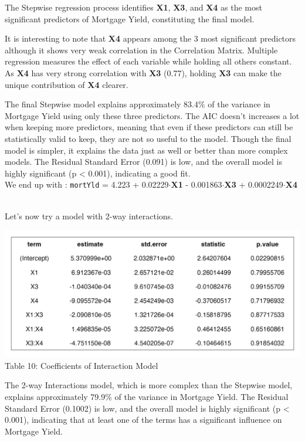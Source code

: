 \documentclass[
  11pt,
]{article}
\begin{document}
The Stepwise regression process identifies \textbf{X1}, \textbf{X3}, and
\textbf{X4} as the most significant predictors of Mortgage Yield,
constituting the final model.

It is interesting to note that \textbf{X4} appears among the 3 most
significant predictors although it shows very weak correlation in the
Correlation Matrix. Multiple regression measures the effect of each
variable while holding all others constant. As \textbf{X4} has very
strong correlation with \textbf{X3} (0.77), holding \textbf{X3} can make
the unique contribution of \textbf{X4} clearer.

The final Stepwise model explains approximately 83.4\% of the variance
in Mortgage Yield using only these three predictors. The AIC doesn't
increases a lot when keeping more predictors, meaning that even if these
predictors can still be statistically valid to keep, they are not so
useful to the model. Though the final model is simpler, it explains the
data just as well or better than more complex models. The Residual
Standard Error (0.091) is low, and the overall model is highly
significant (p \textless{} 0.001), indicating a good fit.\\
We end up with : \texttt{mortYld} = 4.223 + 0.02229\(\cdot\)\textbf{X1}
- 0.001863\(\cdot\)\textbf{X3} + 0.0002249\(\cdot\)\textbf{X4}\\
\strut \\
Let's now try a model with 2-way interactions.

\begin{minipage}{0.4\textwidth}
\includegraphics[width=1.5\linewidth]{interaction_model_coef.png}
\vspace{-0.3em}
\footnotesize Table 10: Coefficients of Interaction Model
\end{minipage}
\hfill
\begin{minipage}{0.35\textwidth}
The 2-way Interactions model, which is more complex than the Stepwise
model, explains approximately 79.9\% of the variance in Mortgage Yield.
The Residual Standard Error (0.1002) is low, and the overall model is
highly significant (p < 0.001), indicating that at least one of the
terms has a significant influence on Mortgage Yield.
\end{minipage}
\end{document}
